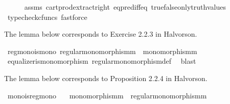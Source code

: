 \begin{isabellebody}
%
\isadelimproof
\ \ \ \ %
\endisadelimproof
%
\isatagproof
{}\isamarkupfalse%
\ assms\ cart{\isacharunderscore}{\kern0pt}prod{\isacharunderscore}{\kern0pt}extract{\isacharunderscore}{\kern0pt}right\ eq{\isacharunderscore}{\kern0pt}pred{\isacharunderscore}{\kern0pt}iff{\isacharunderscore}{\kern0pt}eq\ true{\isacharunderscore}{\kern0pt}false{\isacharunderscore}{\kern0pt}only{\isacharunderscore}{\kern0pt}truth{\isacharunderscore}{\kern0pt}values\ \ \isamarkupfalse%
\ {\isacharparenleft}{\kern0pt}typecheck{\isacharunderscore}{\kern0pt}cfuncs{\isacharcomma}{\kern0pt}\ fastforce{\isacharparenright}{\kern0pt}%
\endisatagproof
{\isafoldproof}%
%
\isadelimproof
%
\endisadelimproof
%
\isadelimdocument
%
\endisadelimdocument
%
\isatagdocument
%
\isamarkuptrue%
%
\endisatagdocument
{\isafolddocument}%
%
\isadelimdocument
%
\endisadelimdocument
%
\begin{isamarkuptext}%
The lemma below corresponds to Exercise 2.2.3 in Halvorson.%
\end{isamarkuptext}\isamarkuptrue%
\isamarkupfalse%
\ regmono{\isacharunderscore}{\kern0pt}is{\isacharunderscore}{\kern0pt}mono{\isacharcolon}{\kern0pt}\ {\isachardoublequoteopen}regular{\isacharunderscore}{\kern0pt}monomorphism{\isacharparenleft}{\kern0pt}m{\isacharparenright}{\kern0pt}\ {\isasymLongrightarrow}\ monomorphism{\isacharparenleft}{\kern0pt}m{\isacharparenright}{\kern0pt}{\isachardoublequoteclose}\isanewline
%
\isadelimproof
\ \ %
\endisadelimproof
%
\isatagproof
{}\isamarkupfalse%
\ equalizer{\isacharunderscore}{\kern0pt}is{\isacharunderscore}{\kern0pt}monomorphism\ regular{\isacharunderscore}{\kern0pt}monomorphism{\isacharunderscore}{\kern0pt}def\ \isamarkupfalse%
\ blast%
\endisatagproof
{\isafoldproof}%
%
\isadelimproof
%
\endisadelimproof
%
\begin{isamarkuptext}%
The lemma below corresponds to Proposition 2.2.4 in Halvorson.%
\end{isamarkuptext}\isamarkuptrue%
\isamarkupfalse%
\ mono{\isacharunderscore}{\kern0pt}is{\isacharunderscore}{\kern0pt}regmono{\isacharcolon}{\kern0pt}\isanewline
\ \ \ {\isachardoublequoteopen}monomorphism{\isacharparenleft}{\kern0pt}m{\isacharparenright}{\kern0pt}\ {\isasymLongrightarrow}\ regular{\isacharunderscore}{\kern0pt}monomorphism{\isacharparenleft}{\kern0pt}m{\isacharparenright}{\kern0pt}{\isachardoublequoteclose}\isanewline
%
\isadelimproof
\ \ %
\endisadelimproof

\end{isabellebody}
